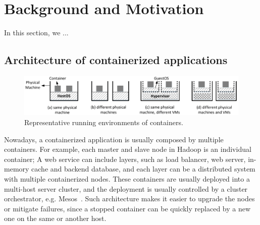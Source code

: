 \section{Background and Motivation}
\label{sec:motivation}

In this section, we ...

\subsection{Architecture of containerized applications}

\begin{figure}[!h]  
	\centering   
	\includegraphics[width=6.7in]{figures/deployment-cases}   
	\caption{\label{fig:deploy-cases} Representative running environments of containers.}   
\end{figure}   



Nowadays, a containerized application is usually composed by multiple containers. For example, each master and slave node in Hadoop is an individual container; A web service can include layers, such as load balancer, web server,
in-memory cache and backend database, and each layer can be a distributed 
system with multiple containerized nodes. 
These containers are usually 
deployed into a multi-host server cluster, and the deployment is usually 
controlled by a cluster orchestrator, e.g. Mesos~\cite{?}. 
Such architecture makes it easier
to upgrade the nodes or mitigate failures, since a stopped container can be quickly replaced by a new one on the same or another host.

